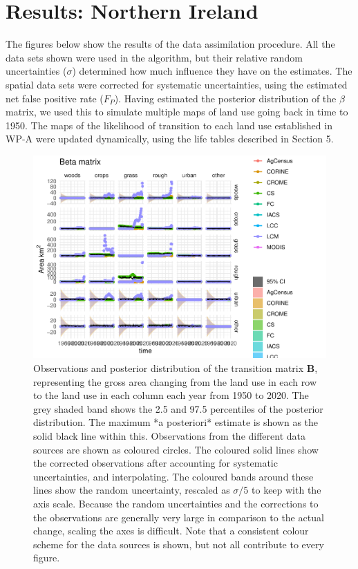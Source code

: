 \documentclass[
]{book}
\begin{document}
\hypertarget{results-northern-ireland}{%
\chapter{Results: Northern Ireland}\label{results-northern-ireland}}

The figures below show the results of the data assimilation procedure. All the data sets shown were used in the algorithm, but their relative random uncertainties (\(\sigma\)) determined how much influence they have on the estimates. The spatial data sets were corrected for systematic uncertainties, using the estimated net false positive rate (\(F_P\)). Having estimated the posterior distribution of the \(\beta\) matrix, we used this to simulate multiple maps of land use going back in time to 1950. The maps of the likelihood of transition to each land use established in WP-A were updated dynamically, using the life tables described in Section 5.

\begin{figure}
\includegraphics[width=1.3\linewidth]{Results_ni_files/figure-latex/plotB-1} \caption{ Observations and posterior distribution of the transition matrix $\mathbf{B}$, representing the gross area changing from the land use in each row to the land use in each column each year from 1950 to 2020. The grey shaded band shows the 2.5 and 97.5 percentiles of the posterior distribution. The maximum *a posteriori* estimate is shown as the solid black line within this. Observations from the different data sources are shown as coloured circles. The coloured solid lines show the corrected observations after accounting for systematic uncertainties, and interpolating. The coloured bands around these lines show the random uncertainty, rescaled as $\sigma /5$ to keep with the axis scale. Because the random uncertainties and the corrections to the observations are generally very large in comparison to the actual change, scaling the axes is difficult. Note that a consistent colour scheme for the data sources is shown, but not all contribute to every figure.}\label{fig:plotB}
\end{figure}
\end{document}
